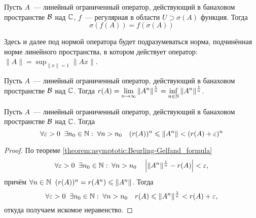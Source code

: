 \begin{theorem}
    \label{theorem:asymptotic:spectral_mapping_theorem}
    Пусть $ A $~--- линейный ограниченный оператор, действующий в банаховом пространстве $ \mathcal{B} $ над $ \mathbb{C} $,
    $ f $~--- регулярная в области $ U \supset \sigma(A) $ функция.
    Тогда
    \begin{equation}
        \label{eq:asymptotic:spectral_mapping_theorem}
        \sigma(f(A)) = f(\sigma(A))
    \end{equation}
\end{theorem}

Здесь и далее под нормой оператора будет подразумеваться норма,
подчинённая норме линейного пространства,
в котором действует оператор: $\displaystyle \| A \| = \sup_{\| x \| = 1} \| A x \| $.

\begin{theorem}
    \label{theorem:asymptotic:Beurling-Gelfand_formula}
    Пусть $ A $~--- линейный ограниченный оператор, действующий в банаховом пространстве $ \mathcal{B} $ над $ \mathbb{C} $.
    Тогда $ \displaystyle r(A) = \lim_{n \to \infty} \| A^n \|^{\frac{1}{n}} = \inf_{n \in \mathbb{N}} \| A^n \|^{\frac{1}{n}} $.
\end{theorem}

\begin{corollary}
    \label{corollary:asymptotic:spectral_radius_norm_bounds}
    Пусть $ A $~--- линейный ограниченный оператор, действующий в банаховом пространстве $ \mathcal{B} $ над $ \mathbb{C} $.
    Тогда
    \[
        \forall \varepsilon > 0 \;\; \exists n_0 \in \mathbb{N}: \; \forall n > n_0 \quad (r(A))^n \leqslant \| A^n \| < (r(A) + \varepsilon)^n
    \]
\end{corollary}

\begin{proof}
    По теореме \ref{theorem:asymptotic:Beurling-Gelfand_formula}
    \[
        \forall \varepsilon > 0 \;\; \exists n_0 \in \mathbb{N}: \; \forall n > n_0 \quad \left| \| A^n \|^{\frac{1}{n}} - r(A) \right| < \varepsilon,
    \]
    причём $ \forall n \in \mathbb{N} \;\; (r(A))^n = r(A^n) \leqslant \| A^n \| $.
    Тогда
    \[
        \forall \varepsilon > 0 \;\; \exists n_0 \in \mathbb{N}: \; \forall n > n_0 \quad r(A) \leqslant \| A^n \|^{\frac{1}{n}} < r(A) + \varepsilon,
    \]
    откуда получаем искомое неравенство.
\end{proof}

